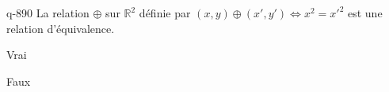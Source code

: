 \begin{truefalse}{q-890}
La relation $\oplus$ sur $\mathbb R^2$ définie par $(x,y)\oplus (x',y') \iff x^2=x'^2$ est une relation d'équivalence.
\item* Vrai
\item Faux
\end{truefalse}

